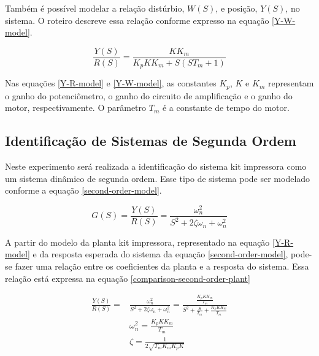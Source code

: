 Também é possível modelar a relação distúrbio, $W(S)$, e posição, $Y(S)$, no sistema. O roteiro \cite{CDIN:Roteiro1} descreve essa relação conforme expresso na equação \ref{Y-W-model}.

\begin{equation}
\frac{Y(S)}{R(S)} = \frac{ K K_m  }{ K_p K K_m + S(ST_m +1) } 
\label{Y-W-model}
\end{equation}

Nas equações \ref{Y-R-model} e \ref{Y-W-model}, as constantes $K_p$, $K$ e $K_m$ representam o ganho do potenciômetro, o ganho do circuito de amplificação e o ganho do motor, respectivamente. O parâmetro $T_m$ é a constante de tempo do motor.



\subsection{Identificação de Sistemas de Segunda Ordem}
Neste experimento será realizada a identificação do sistema kit impressora como um sistema dinâmico de segunda ordem. Esse tipo de sistema pode ser modelado conforme a equação \ref{second-order-model}.

\begin{equation}
G(S) = \frac{Y(S)}{R(S)} = \frac{ \omega_n ^2  }{ S^2+2\zeta\omega_n + \omega_n ^2 } 
\label{second-order-model}
\end{equation}

A partir do modelo da planta kit impressora, representado na equação \ref{Y-R-model} e da resposta esperada do sistema da equação \ref{second-order-model}, pode-se fazer uma relação entre os coeficientes da planta e a resposta do sistema. Essa relação está expressa na equação \ref{comparison-second-order-plant}

\begin{equation}
\begin{aligned}
\frac{Y(S)}{R(S)} ={} & \frac{ \omega_n ^2  }{ S^2+2\zeta\omega_n + \omega_n ^2 } = \frac{\frac{K_p K K_m}{T_m}}{S^2+ \frac{S}{T_m}+ \frac{K_p K K_m}{T_m}} \\
& \omega_n ^2 = \frac{K_p K K_m}{T_m} \\
& \zeta = \frac{1}{2\sqrt{T_m K_m K_p K}}
\end{aligned}
\label{comparison-second-order-plant}
\end{equation}

